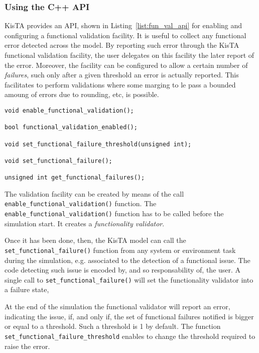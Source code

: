 \subsubsection{Using the C++ API}
\label{sec:app_initialization_cpp_api}

KisTA provides an API, shown in Listing~\ref{list:fun_val_api} for enabling and configuring a functional validation facility.
%
It is useful to collect any functional error detected across the model.
By reporting such error through the KisTA functional validation facility, the user delegates on this
facility the later report of the error.
Moreover, the facility can be configured to allow a certain number of \emph{failures}, such only after a given
threshold an error is actually reported. 
This facilitates to perform validations where some marging to le pass a bounded amoung of errors due to rounding, etc, is possible.
%
\begin{lstlisting}[style=KistaCodeStyle,caption={API for enabling and configuring functional validation facility.},label=list:fun_val_api]
void enable_functional_validation();

bool functional_validation_enabled();

void set_functional_failure_threshold(unsigned int);

void set_functional_failure();

unsigned int get_functional_failures();
\end{lstlisting}

The validation facility can be created by means of the call \texttt{enable\_functional\_validation()} function.
The \texttt{enable\_functional\_validation()} function has to be called before the simulation start.
It creates a \emph{functionality validator}.

Once it has been done, then, the KisTA model can call the \texttt{set\_functional\_failure()} function from any system or environment task
during the simulation, e.g. associated to the detection of a functional issue.
The code detecting such issue is encoded by, and so responsability of, the user.
A single call to \texttt{set\_functional\_failure()} will set the functionality validator into a failure state,

At the end of the simulation the functional validator  will report an error, indicating the issue, if, and only if,
the set of functional failures notified is bigger or equal to a threshold.
Such a threshold is 1 by default.
The function \texttt{set\_functional\_failure\_threshold} enables to change the threshold required to raise the error.

